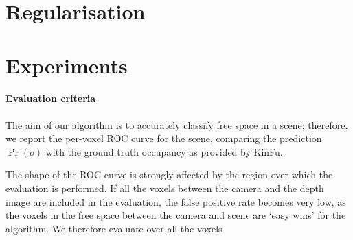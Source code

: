 \documentclass[10pt,twocolumn,letterpaper]{article}
\newcommand{\point}{\mathbf{p}}
\begin{document}







\section{Regularisation}



\section{Experiments}

\paragraph{Evaluation criteria}
The aim of our algorithm is to accurately classify free space in a scene; therefore, we report the per-voxel ROC curve for the scene, comparing the prediction $\Pr(o)$ with the ground truth occupancy as provided by KinFu.

The shape of the ROC curve is strongly affected by the region over which the evaluation is performed.
If all the voxels between the camera and the depth image are included in the evaluation, the false positive rate becomes very low, as the voxels in the free space between the camera and scene are `easy wins' for the algorithm. We therefore evaluate over all the voxels 
\end{document}
